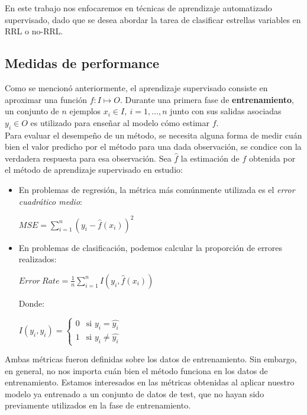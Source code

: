 En este trabajo nos enfocaremos en técnicas de aprendizaje automatizado supervisado, dado que se desea abordar la tarea de clasificar estrellas variables en RRL o no-RRL. 

\subsection{Medidas de performance}
\label{ml_intro_test}
Como se mencionó anteriormente, el aprendizaje supervisado consiste en aproximar una función $f : I \mapsto O$. Durante una primera fase de \textbf{entrenamiento}, un conjunto de $n$ ejemplos $x_i \in I, \ i=1,\ldots,n$ junto con sus salidas asociadas $y_i \in O$ es utilizado para enseñar al modelo cómo estimar $f$. \\

Para evaluar el desempeño de un método, se necesita alguna forma de medir cuán bien el valor predicho por el método para una dada observación, se condice con la verdadera respuesta para esa observación. Sea $\hat{f}$ la estimación de $f$ obtenida por el método de aprendizaje supervisado en estudio:

\begin{itemize}

\item  En problemas de regresión, la métrica más comúnmente utilizada es el \textit{error cuadrático medio}:

\begin{center}
$MSE = \sum_{i=1}^{n} ( y_i - \hat{f}(x_i) )^2 $
\end{center}

\item En problemas de clasificación, podemos calcular la proporción de errores realizados:

\begin{center}
$Error \ Rate = \frac{1}{n} \sum_{i=1}^{n} I( y_i , \hat{f}(x_i) ) $
\end{center}

Donde:
\begin{center}
$
I(y_i,\hat{y_i}) =
\left\{
	\begin{array}{ll}
		0  & \mbox{si } y_i = \hat{y_i} \\
		1 & \mbox{si } y_i \neq \hat{y_i}
	\end{array}
\right.
$
\end{center}

\end{itemize}

Ambas métricas fueron definidas sobre los datos de entrenamiento. Sin embargo, en general, no nos importa cuán bien el método funciona en los datos de entrenamiento. Estamos interesados en las métricas obtenidas al aplicar nuestro modelo ya entrenado a un conjunto de datos de test, que no hayan sido previamente utilizados en la fase de entrenamiento. \\

